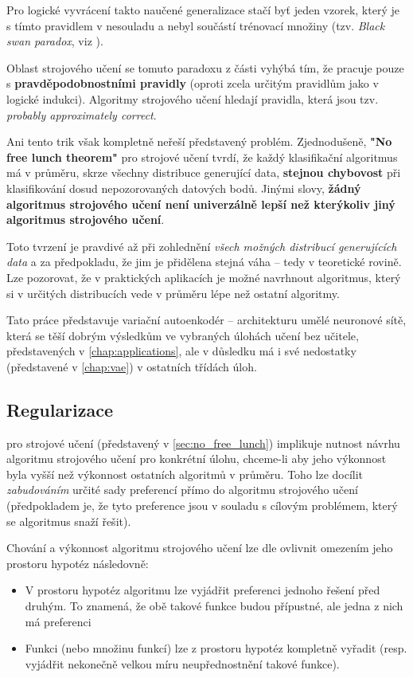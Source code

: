 Pro logické vyvrácení takto naučené generalizace stačí byť jeden vzorek, který je s tímto pravidlem v nesouladu a nebyl součástí trénovací množiny (tzv. \emph{Black swan paradox}, viz \textcite{Taleb2008}).

Oblast strojového učení se tomuto paradoxu z části vyhýbá tím, že pracuje pouze s \textbf{pravděpodobnostními pravidly} (oproti zcela určitým pravidlům jako v logické indukci).
Algoritmy strojového učení hledají pravidla, která jsou tzv. \emph{probably approximately correct}. \cite{Valiant1984}

Ani tento trik však kompletně neřeší představený problém. Zjednodušeně, \textbf{"No free lunch theorem"} pro strojové učení tvrdí, že každý klasifikační algoritmus má v průměru, skrze všechny distribuce generující data, \textbf{stejnou chybovost} při klasifikování dosud nepozorovaných datových bodů. \cite{Wolpert1996}
Jinými slovy, \textbf{žádný algoritmus strojového učení není univerzálně lepší než kterýkoliv jiný algoritmus strojového učení}.

Toto tvrzení je pravdivé až při zohlednění \emph{všech možných distribucí generujících data} a za předpokladu, že jim je přidělena stejná váha \cite{Hibbard2009} – tedy v teoretické rovině.
Lze pozorovat, že v praktických aplikacích je možné navrhnout algoritmus, který si v určitých distribucích vede v průměru lépe než ostatní algoritmy. \cite{Goodfellow2016}

Tato práce představuje variační autoenkodér – architekturu umělé neuronové sítě, která se těší dobrým výsledkům ve vybraných úlohách učení bez učitele, představených v \autoref{chap:applications}, ale v důsledku má i své nedostatky (představené v \autoref{chap:vae}) v ostatních třídách úloh.

\subsection{Regularizace}
\label{sec:regularization}
 pro strojové učení (představený v \autoref{sec:no_free_lunch}) implikuje nutnost návrhu algoritmu strojového učení pro konkrétní úlohu, chceme-li aby jeho výkonnost byla vyšší než výkonnost ostatních algoritmů v průměru.
Toho lze docílit \emph{zabudováním} určité sady preferencí přímo do algoritmu strojového učení (předpokladem je, že tyto preference jsou v souladu s cílovým problémem, který se algoritmus snaží řešit). \cite{Goodfellow2016}


Chování a výkonnost algoritmu strojového učení lze dle \textcite{Goodfellow2016} ovlivnit omezením jeho prostoru hypotéz následovně:
\begin{itemize}
    \item V prostoru hypotéz algoritmu lze vyjádřit preferenci jednoho řešení před druhým. To znamená, že obě takové funkce budou přípustné, ale jedna z nich má preferenci
    \item Funkci (nebo množinu funkcí) lze z prostoru hypotéz kompletně vyřadit (resp. vyjádřit nekonečně velkou míru neupřednostnění takové funkce).
\end{itemize}

